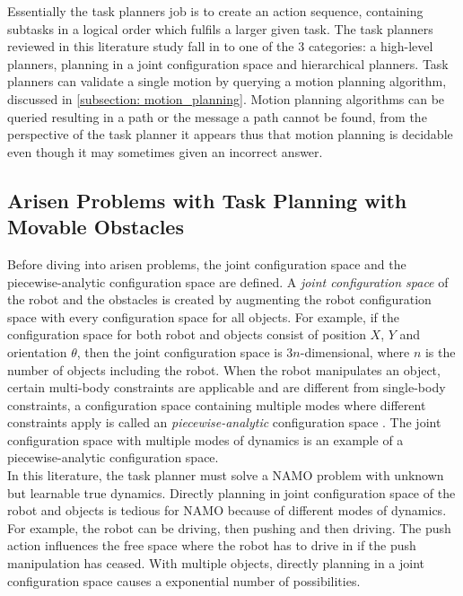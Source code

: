 Essentially the task planners job is to create an action sequence, containing subtasks in a logical order which fulfils a larger given task. The task planners reviewed in this literature study fall in to one of the 3 categories: a high-level planners, planning in a joint configuration space and hierarchical planners. Task planners can validate a single motion by querying a motion planning algorithm, discussed in \cref{subsection: motion_planning}. Motion planning algorithms can be queried resulting in a path or the message a path cannot be found, from the perspective of the task planner it appears thus that motion planning is decidable even though it may sometimes given an incorrect answer. 

\subsection{Arisen Problems with Task Planning with Movable Obstacles}
\label{subsection: problems_with_task_planning}
Before diving into arisen problems, the joint configuration space and the piecewise-analytic configuration space are defined. A \textit{joint configuration space} of the robot and the obstacles is created by augmenting the robot configuration space with every configuration space for all objects. For example, if the configuration space for both robot and objects consist of position $X$, $Y$ and orientation $\theta$, then the joint configuration space is $3n$-dimensional, where $n$ is the number of objects including the robot. When the robot manipulates an object, certain multi-body constraints are applicable and are different from single-body constraints, a configuration space containing multiple modes where different constraints apply is called an \textit{piecewise-analytic} configuration space \cite{goldberg_asymptotically_2020}. The joint configuration space with multiple modes of dynamics is an example of a piecewise-analytic configuration space.\\

In this literature, the task planner must solve a \ac{NAMO} problem with unknown but learnable true dynamics. Directly planning in joint configuration space of the robot and objects is tedious for \ac{NAMO} because of different modes of dynamics. For example, the robot can be driving, then pushing and then driving. The push action influences the free space where the robot has to drive in if the push manipulation has ceased. With multiple objects, directly planning in a joint configuration space causes a exponential number of possibilities. \\

